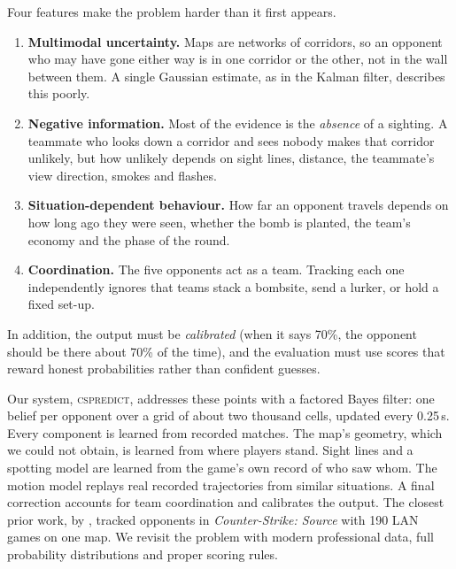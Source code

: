 \documentclass[11pt]{article}
\newcommand{\cs}{\textsc{cspredict}}
\newcommand{\1}{\mathbb{1}}
\begin{document}
Four features make the problem harder than it first appears.
\begin{enumerate}[label=(\roman*)]
  \item \textbf{Multimodal uncertainty.} Maps are networks of corridors, so an opponent who may have gone either way is in one corridor or the other, not in the wall between them. A single Gaussian estimate, as in the Kalman filter, describes this poorly.
  \item \textbf{Negative information.} Most of the evidence is the \emph{absence} of a sighting. A teammate who looks down a corridor and sees nobody makes that corridor unlikely, but how unlikely depends on sight lines, distance, the teammate's view direction, smokes and flashes.
  \item \textbf{Situation-dependent behaviour.} How far an opponent travels depends on how long ago they were seen, whether the bomb is planted, the team's economy and the phase of the round.
  \item \textbf{Coordination.} The five opponents act as a team. Tracking each one independently ignores that teams stack a bombsite, send a lurker, or hold a fixed set-up.
\end{enumerate}
In addition, the output must be \emph{calibrated} (when it says 70\%, the opponent should be there about 70\% of the time), and the evaluation must use scores that reward honest probabilities rather than confident guesses.

Our system, \cs, addresses these points with a factored Bayes filter: one belief per opponent over a grid of about two thousand cells, updated every 0.25\,s. Every component is learned from recorded matches. The map's geometry, which we could not obtain, is learned from where players stand. Sight lines and a spotting model are learned from the game's own record of who saw whom. The motion model replays real recorded trajectories from similar situations. A final correction accounts for team coordination and calibrates the output. The closest prior work, by \citet{hladky2008evaluation}, tracked opponents in \emph{Counter-Strike: Source} with 190 LAN games on one map. We revisit the problem with modern professional data, full probability distributions and proper scoring rules.
\end{document}
